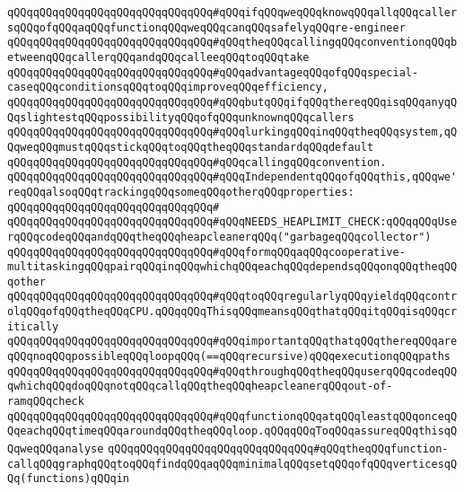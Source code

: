 \verb|qQQqqQQqqQQqqQQqqQQqqQQqqQQqqQQq#qQQqifqQQqweqQQqknowqQQqallqQQqcallersqQQqofqQQqaqQQqfunctionqQQqweqQQqcanqQQqsafelyqQQqre-engineer|\newline
\verb|qQQqqQQqqQQqqQQqqQQqqQQqqQQqqQQq#qQQqtheqQQqcallingqQQqconventionqQQqbetweenqQQqcallerqQQqandqQQqcalleeqQQqtoqQQqtake|\newline
\verb|qQQqqQQqqQQqqQQqqQQqqQQqqQQqqQQq#qQQqadvantageqQQqofqQQqspecial-caseqQQqconditionsqQQqtoqQQqimproveqQQqefficiency,|\newline
\verb|qQQqqQQqqQQqqQQqqQQqqQQqqQQqqQQq#qQQqbutqQQqifqQQqthereqQQqisqQQqanyqQQqslightestqQQqpossibilityqQQqofqQQqunknownqQQqcallers|\newline
\verb|qQQqqQQqqQQqqQQqqQQqqQQqqQQqqQQq#qQQqlurkingqQQqinqQQqtheqQQqsystem,qQQqweqQQqmustqQQqstickqQQqtoqQQqtheqQQqstandardqQQqdefault|\newline
\verb|qQQqqQQqqQQqqQQqqQQqqQQqqQQqqQQq#qQQqcallingqQQqconvention.|\newline
\verb|qQQqqQQqqQQqqQQqqQQqqQQqqQQqqQQq#qQQqIndependentqQQqofqQQqthis,qQQqwe'reqQQqalsoqQQqtrackingqQQqsomeqQQqotherqQQqproperties:|\newline
\verb|qQQqqQQqqQQqqQQqqQQqqQQqqQQqqQQq#|\newline
\verb|qQQqqQQqqQQqqQQqqQQqqQQqqQQqqQQq#qQQqNEEDS_HEAPLIMIT_CHECK:qQQqqQQqUserqQQqcodeqQQqandqQQqtheqQQqheapcleanerqQQq("garbageqQQqcollector")|\newline
\verb|qQQqqQQqqQQqqQQqqQQqqQQqqQQqqQQq#qQQqformqQQqaqQQqcooperative-multitaskingqQQqpairqQQqinqQQqwhichqQQqeachqQQqdependsqQQqonqQQqtheqQQqother|\newline
\verb|qQQqqQQqqQQqqQQqqQQqqQQqqQQqqQQq#qQQqtoqQQqregularlyqQQqyieldqQQqcontrolqQQqofqQQqtheqQQqCPU.qQQqqQQqThisqQQqmeansqQQqthatqQQqitqQQqisqQQqcritically|\newline
\verb|qQQqqQQqqQQqqQQqqQQqqQQqqQQqqQQq#qQQqimportantqQQqthatqQQqthereqQQqareqQQqnoqQQqpossibleqQQqloopqQQq(==qQQqrecursive)qQQqexecutionqQQqpaths|\newline
\verb|qQQqqQQqqQQqqQQqqQQqqQQqqQQqqQQq#qQQqthroughqQQqtheqQQquserqQQqcodeqQQqwhichqQQqdoqQQqnotqQQqcallqQQqtheqQQqheapcleanerqQQqout-of-ramqQQqcheck|\newline
\verb|qQQqqQQqqQQqqQQqqQQqqQQqqQQqqQQq#qQQqfunctionqQQqatqQQqleastqQQqonceqQQqeachqQQqtimeqQQqaroundqQQqtheqQQqloop.qQQqqQQqToqQQqassureqQQqthisqQQqweqQQqanalyse|\newline
\verb|qQQqqQQqqQQqqQQqqQQqqQQqqQQqqQQq#qQQqtheqQQqfunction-callqQQqgraphqQQqtoqQQqfindqQQqaqQQqminimalqQQqsetqQQqofqQQqverticesqQQq(functions)qQQqin|\newline
